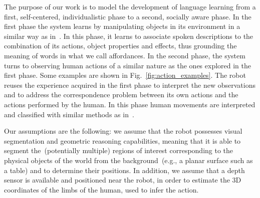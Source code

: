 The purpose of
our work
is to model the development of language learning from a first, self-centered, individualistic phase to a second, socially aware phase.
In the first phase the system learns by manipulating objects in its environment in a similar way as in~\cite{salvi:2012:smcb}.
In this phase, it learns to associate spoken descriptions to the combination of its actions, object properties and effects, thus grounding the meaning of words in what we call affordances.
In the second phase, the system turns to observing human actions of a similar nature as the ones explored in the first phase. Some examples are shown in Fig.~\ref{fig:action_examples}.
The robot reuses the experience acquired in the first phase to interpret the new observations and to address the correspondence problem between its own actions and the actions performed by the human.
In this phase human movements are interpreted and classified with similar methods as in~\cite{saponaro:2013:crhri}.

Our assumptions are the following:
we assume that the robot possesses visual segmentation and geometric reasoning capabilities, meaning that it is able to segment the~(potentially multiple) regions of interest corresponding to the physical objects of the world from the background~(e.g., a planar surface such as a table) and to determine their positions.
In addition, we assume that a depth sensor is available and positioned near the robot, in order to estimate the 3D coordinates of the limbs of the human, used to infer the action.

